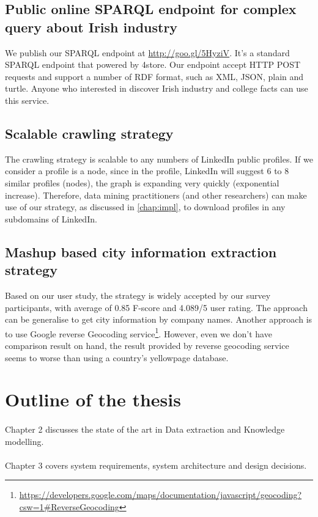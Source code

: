 \subsection{Public online SPARQL endpoint for complex query about Irish industry}
We publish our SPARQL endpoint at \url{http://goo.gl/5HyziV}. It's a standard SPARQL endpoint that powered by 4store\cite{harris20094store}. Our endpoint accept HTTP POST requests and support a number of RDF format, such as XML, JSON, plain and turtle. Anyone who interested in discover Irish industry and college facts can use this service.

\subsection{Scalable crawling strategy}
The crawling strategy is scalable to any numbers of LinkedIn public profiles. If we consider a profile is a node, since in the profile, LinkedIn will suggest 6 to 8 similar profiles (nodes), the graph is expanding very quickly (exponential increase). Therefore, data mining practitioners (and other researchers) can make use of our strategy, as discussed in \autoref{chap:impl}, to download profiles in any subdomains of LinkedIn.

\subsection{Mashup based city information extraction strategy}

Based on our user study, the strategy is widely accepted by our survey participants, with average of 0.85 F-score and 4.089/5 user rating. The approach can be generalise to get city information by company names. Another approach is to use Google reverse Geocoding service\footnote{\url{https://developers.google.com/maps/documentation/javascript/geocoding?csw=1\#ReverseGeocoding}}. However, even we don't have comparison result on hand, the result provided by reverse geocoding service seems to worse than using a country's yellowpage database.

\section{Outline of the thesis}
\paragraph{}
Chapter 2 discusses the state of the art in Data extraction and Knowledge modelling.
\paragraph{}
Chapter 3 covers system requirements, system architecture and design decisions.

